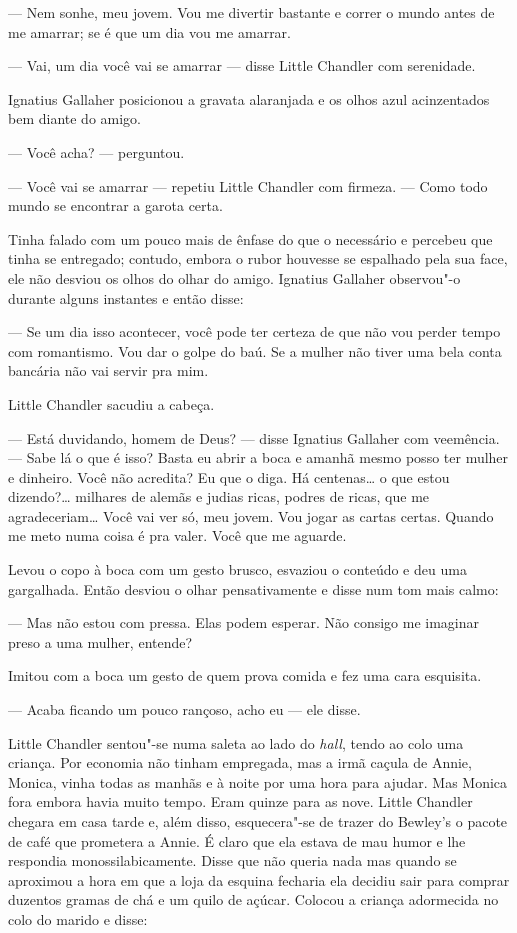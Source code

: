 --- Nem sonhe, meu jovem.  Vou me divertir bastante e correr o mundo antes de
me amarrar; se é que um dia vou me amarrar.

--- Vai, um dia você vai se amarrar --- disse Little Chandler com serenidade.

Ignatius Gallaher posicionou a gravata alaranjada e os olhos azul acinzentados
bem diante do amigo.

--- Você acha? --- perguntou.

--- Você vai se amarrar --- repetiu Little Chandler com firmeza.  --- Como todo
mundo se encontrar a garota certa.

Tinha falado com um pouco mais de ênfase do que o necessário e percebeu que
tinha se entregado; contudo, embora o rubor houvesse se espalhado pela sua
face, ele não desviou os olhos do olhar do amigo.  Ignatius Gallaher observou"-o
durante alguns instantes e então disse:

--- Se um dia isso acontecer, você pode ter certeza de que não vou perder tempo
com romantismo.  Vou dar o golpe do baú.  Se a mulher não tiver uma bela conta
bancária não vai servir pra mim.

Little Chandler sacudiu a cabeça.

--- Está duvidando, homem de Deus? --- disse Ignatius Gallaher com veemência.
--- Sabe lá o que é isso?  Basta eu abrir a boca e amanhã mesmo posso ter
mulher e dinheiro.  Você não acredita?  Eu que o diga.  Há centenas\ldots{} o
que estou dizendo?\ldots{} milhares de alemãs e judias ricas, podres de ricas,
que me agradeceriam\ldots{} Você vai ver só, meu jovem.  Vou jogar as cartas
certas.  Quando me meto numa coisa é pra valer.  Você que me aguarde.

Levou o copo à boca com um gesto brusco, esvaziou o conteúdo e deu uma
gargalhada.  Então desviou o olhar pensativamente e disse num tom mais calmo:

--- Mas não estou com pressa.  Elas podem esperar.  Não consigo me imaginar
preso a uma mulher, entende?

Imitou com a boca um gesto de quem prova comida e fez uma cara esquisita.

--- Acaba ficando um pouco rançoso, acho eu --- ele disse.

\smallskip

\noindent\dotfill

\smallskip

Little Chandler sentou"-se numa saleta ao lado do \textit{hall}, tendo ao colo
uma criança.  Por economia não tinham empregada, mas a irmã caçula de Annie,
Monica, vinha todas as manhãs e à noite por uma hora para ajudar.  Mas Monica
fora embora havia muito tempo.  Eram quinze para as nove.  Little Chandler
chegara em casa tarde e, além disso, esquecera"-se de trazer do Bewley’s o
pacote de café que prometera a Annie.  É claro que ela estava de mau humor e
lhe respondia monossilabicamente.  Disse que não queria nada mas quando se
aproximou a hora em que a loja da esquina fecharia ela decidiu sair para
comprar duzentos gramas de chá e um quilo de açúcar.  Colocou a criança
adormecida no colo do marido e disse:

